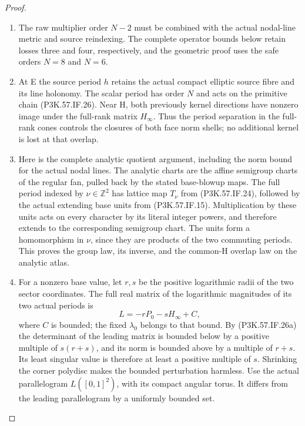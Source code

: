 \begin{proof}
\begin{enumerate}[label=\arabic*.]
\item The raw multiplier order \(N-2\) must be combined with the actual nodal-line metric and source reindexing. The complete operator bounds below retain losses three and four, respectively, and the geometric proof uses the safe orders \(N=8\) and \(N=6\).

\item At E the source period \(h\) retains the actual compact elliptic
source fibre and its line holonomy. The scalar period has order \(N\)
and acts on the primitive chain (P3K.57.IF.26). Near H, both previously
kernel directions have nonzero image under the full-rank matrix
\(H_\infty\). Thus the period separation in the full-rank cones
controls the closures of both face norm shells; no additional
kernel is lost at that overlap.

\item Here is the complete analytic quotient argument, including the
norm bound for the actual nodal lines. The analytic charts are
the affine semigroup charts of the regular fan, pulled back by
the stated base-blowup maps. The full period indexed by
\(\nu\in\mathbb Z^2\) has lattice map \(T_\nu\) from
(P3K.57.IF.24), followed by the actual extending base units from
(P3K.57.IF.15). Multiplication by these units acts on every character
by its literal integer powers, and therefore extends to the
corresponding semigroup chart. The units form a homomorphism
in \(\nu\), since they are products of the two commuting
periods. This proves the group law, its inverse, and the
common-H overlap law on the analytic atlas.

\item For a nonzero base value, let \(r,s\) be the positive logarithmic
radii of the two sector coordinates. The full real matrix of
the logarithmic magnitudes of its two actual periods is
\[
                       L=-rP_0-sH_\infty+C,             \tag{P3K.57.IF.28a}
\]
where \(C\) is bounded; the fixed \(\lambda_0\) belongs
to that bound. By (P3K.57.IF.26a) the determinant of the leading
matrix is bounded below by a positive multiple of
\(s(r+s)\), and its norm is bounded above by a multiple
of \(r+s\). Its least singular value is therefore at
least a positive multiple of \(s\). Shrinking the corner
polydisc makes the bounded perturbation harmless. Use the
actual parallelogram \(L([0,1]^2)\), with its compact
angular torus. It differs from the leading parallelogram
by a uniformly bounded set.


\end{enumerate}
\end{proof}

